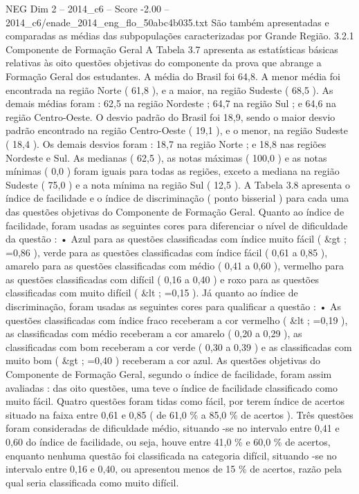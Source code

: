 \begin{textsample}{NEG Dim 2 – 2014\_c6 – Score -2.00 – 2014\_c6/enade\_2014\_eng\_flo\_50abc4b035.txt}
São também apresentadas e comparadas as médias das subpopulações caracterizadas por Grande Região. 3.2.1 Componente de Formação Geral A Tabela 3.7 apresenta as estatísticas básicas relativas às oito questões objetivas do componente da prova que abrange a Formação Geral dos estudantes.
A média do Brasil foi 64,8.
A menor média foi encontrada na região Norte ( 61,8 ), e a maior, na região Sudeste ( 68,5 ).
As demais médias foram : 62,5 na região Nordeste ; 64,7 na região Sul ; e 64,6 na região Centro-Oeste.
O desvio padrão do Brasil foi 18,9, sendo o maior desvio padrão encontrado na região Centro-Oeste ( 19,1 ), e o menor, na região Sudeste ( 18,4 ).
Os demais desvios foram : 18,7 na região Norte ; e 18,8 nas regiões Nordeste e Sul.
As medianas ( 62,5 ), as notas máximas ( 100,0 ) e as notas mínimas ( 0,0 ) foram iguais para todas as regiões, exceto a mediana na região Sudeste ( 75,0 ) e a nota mínima na região Sul ( 12,5 ).
A Tabela 3.8 apresenta o índice de facilidade e o índice de discriminação ( ponto bisserial ) para cada uma das questões objetivas do Componente de Formação Geral.
Quanto ao índice de facilidade, foram usadas as seguintes cores para diferenciar o nível de dificuldade da questão : • Azul para as questões classificadas com índice muito fácil ( \&gt ; =0,86 ), verde para as questões classificadas com índice fácil ( 0,61 a 0,85 ), amarelo para as questões classificadas com médio ( 0,41 a 0,60 ), vermelho para as questões classificadas com difícil ( 0,16 a 0,40 ) e roxo para as questões classificadas com muito difícil ( \&lt ; =0,15 ).
Já quanto ao índice de discriminação, foram usadas as seguintes cores para qualificar a questão : • As questões classificadas com índice fraco receberam a cor vermelho ( \&lt ; =0,19 ), as classificadas com médio receberam a cor amarelo ( 0,20 a 0,29 ), as classificadas com bom receberam a cor verde ( 0,30 a 0,39 ) e as classificadas com muito bom ( \&gt ; =0,40 ) receberam a cor azul.
As questões objetivas do Componente de Formação Geral, segundo o índice de facilidade, foram assim avaliadas : das oito questões, uma teve o índice de facilidade classificado como muito fácil.
Quatro questões foram tidas como fácil, por terem índice de acertos situado na faixa entre 0,61 e 0,85 ( de 61,0 \% a 85,0 \% de acertos ).
Três questões foram consideradas de dificuldade médio, situando -se no intervalo entre 0,41 e 0,60 do índice de facilidade, ou seja, houve entre 41,0 \% e 60,0 \% de acertos, enquanto nenhuma questão foi classificada na categoria difícil, situando -se no intervalo entre 0,16 e 0,40, ou apresentou menos de 15 \% de acertos, razão pela qual seria classificada como muito difícil.

\end{textsample}
